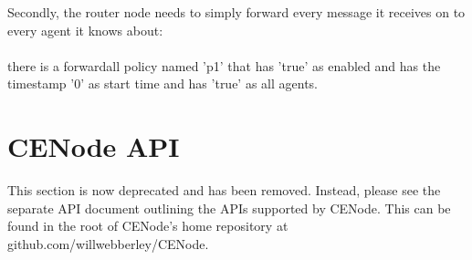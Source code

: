 \documentclass{scrartcl}
\newcommand{\ce}[1]{\textsf{#1}}
\begin{document}
Secondly, the router node needs to simply forward every message it receives on to every agent it knows about:\\
\\\ce{there is a forwardall policy named 'p1' that has 'true' as enabled and has the timestamp '0' as start time and has 'true' as all agents.}


\section{CENode API}
\label{api}
\begin{emph}
This section is now deprecated and has been removed. Instead, please see the separate API document outlining the APIs supported by CENode. This can be found in the root of CENode's home repository at github.com/willwebberley/CENode.
\end{emph}



\end{document}
